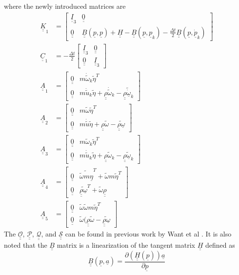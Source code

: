 \documentclass{aiaa-tc}
\newcommand{\tens}[1]{\underline{\underline{#1}}}
\renewcommand{\vec}[1]{\underline{#1}}
\begin{document}
where the newly introduced matrices are
\begin{align}
   \label{K1}
   \tens{K}_1 &=
   \begin{bmatrix}
   \tens{I}_3 & \tens{0} \\
   \tens{0} & \tens{B}(\vec{p},\vec{p}) + \tens{H} - \tens{B}(\vec{p},\vec{p}_k) -\frac{\Delta t}{2} \tens{B}(\vec{p},\vec{\dot{p}}_k)
   \end{bmatrix} \\
   \label{C1}
   \tens{C}_1 &=
   -\frac{\Delta t}{2} \begin{bmatrix}
   \tens{I}_3 & \tens{0} \\
   \tens{0} & \tens{I}_3 
   \end{bmatrix} \\
   \label{A1}
   \tens{A}_1 &=
    \begin{bmatrix}
   \tens{0} & m \dot{\tilde{\omega}}_k \tilde{\eta}^T \\
   \tens{0} & m \ddot{\tilde{u}}_k \tilde{\eta}+\tens{\rho} \dot{\tilde{\omega}}_k-\widetilde{\tens{\rho}{\dot{\vec{\omega}}_k}}
   \end{bmatrix} \\
   \label{A2}
   \tens{A}_2 &=
    \begin{bmatrix}
   \tens{0} & m \tilde{\omega} \tilde{\eta}^T \\
   \tens{0} & m \dot{\tilde{u}} \tilde{\eta}+\tens{\rho} \tilde{\omega}-\widetilde{\tens{\rho}\vec{\omega} }
   \end{bmatrix} \\
   \label{A3}
   \tens{A}_3 &=
    \begin{bmatrix}
   \tens{0} & m \tilde{\omega}_k \tilde{\eta}^T \\
   \tens{0} & m \dot{\tilde{u}}_k \tilde{\eta}+\tens{\rho} \tilde{\omega}_k-\widetilde{\tens{\rho}\vec{\omega}_k}
   \end{bmatrix} \\
   \label{A4}
   \tens{A}_4 &=
    \begin{bmatrix}
   \tens{0} & \widetilde{\tilde{\omega}m\vec{\eta}}^T+\tilde{\omega}m\tilde{\eta}^T \\
   \tens{0} & \widetilde{\tens{\rho}\vec{\omega}}^T+\tilde{\omega}\tens{\rho}
   \end{bmatrix} \\
   \label{A5}
   \tens{A}_5 &=
    \begin{bmatrix}
   \tens{0} & \tilde{\omega} \tilde{\omega} m \tilde{\eta}^T \\
   \tens{0} & \tilde{\omega} (\tens{\rho} \tilde{\omega} - \widetilde{\tens{\rho} \vec{\omega}}
   \end{bmatrix} 
\end{align}
The $\tens{\mathcal{O}}$, $\tens{\mathcal{P}}$, $\tens{\mathcal{Q}}$, and $\tens{\mathcal{S}}$ can be found in previous work by Want et al \cite{Wang:GEBT2014}. It is also noted that the $\tens{B}$ matrix is a linearization of the tangent matrix $\tens{H}$ defined as
\begin{equation}
    \label{Bmatrix}
    \tens{B}(\vec{p},\vec{a}) = \frac{\partial (\tens{H}(\vec{p})) \vec{a}}{\partial \vec{p}}
\end{equation}
\end{document}
